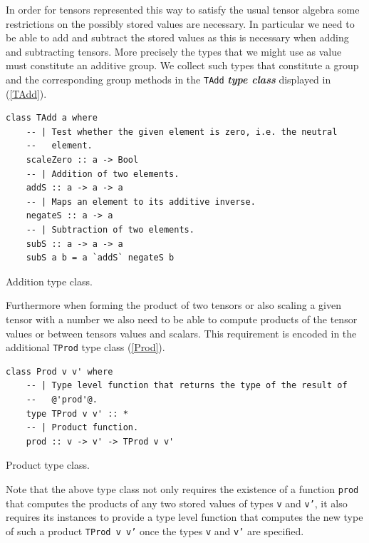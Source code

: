 \documentclass[a4paper,12pt, DIV=14, BCOR=5mm, twoside, headsepline, numbers=noenddot]{scrbook}
\begin{document}
In order for tensors represented this way to satisfy the usual tensor algebra some restrictions on the possibly stored values are necessary. In particular we need to be able to add and subtract the stored values as this is necessary when adding and subtracting tensors.
More precisely the types that we might use as value must constitute an additive group. 
We collect such types that constitute a group and the corresponding group methods in the \texttt{TAdd} \textit{\textbf{type class}} displayed in (\ref{TAdd}).

\begin{listing}[hbt!]
\begin{verbatim}
class TAdd a where
    -- | Test whether the given element is zero, i.e. the neutral
    --   element.
    scaleZero :: a -> Bool
    -- | Addition of two elements.
    addS :: a -> a -> a
    -- | Maps an element to its additive inverse.
    negateS :: a -> a
    -- | Subtraction of two elements.
    subS :: a -> a -> a
    subS a b = a `addS` negateS b
\end{verbatim} 
\caption{Addition type class.}\label{TAdd}
\end{listing}

Furthermore when forming the product of two tensors or also scaling a given tensor with a number we also need to be able to compute products of the tensor values or between tensors values and scalars. This requirement is encoded in the additional \texttt{TProd} type class (\ref{Prod}).

\begin{listing}[hbt!] 
\begin{verbatim}
class Prod v v' where
    -- | Type level function that returns the type of the result of
    --   @'prod'@.
    type TProd v v' :: *
    -- | Product function.
    prod :: v -> v' -> TProd v v'
\end{verbatim} 
\caption{Product type class.}\label{Prod}
\end{listing}

Note that the above type class not only requires the existence of a function \texttt{prod} that computes the products of any two stored values of types \texttt{v} and \texttt{v'}, it also requires its instances to provide a type level function that computes the new type of such a product \texttt{TProd v v'} once the types \texttt{v} and \texttt{v'} are specified.
\end{document}
